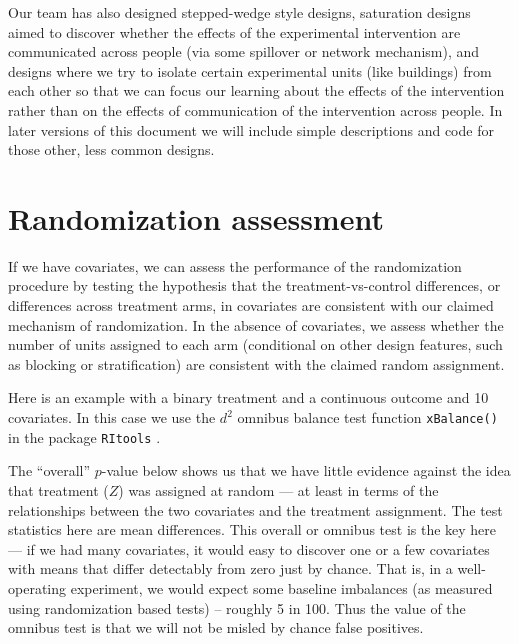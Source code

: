 \documentclass[
  12pt,
]{book}
\newenvironment{Shaded}{\begin{snugshade}}{\end{snugshade}}
\newcommand{\DataTypeTok}[1]{\textcolor[rgb]{0.13,0.29,0.53}{#1}}
\newcommand{\KeywordTok}[1]{\textcolor[rgb]{0.13,0.29,0.53}{\textbf{#1}}}
\newcommand{\NormalTok}[1]{#1}
\newcommand{\OperatorTok}[1]{\textcolor[rgb]{0.81,0.36,0.00}{\textbf{#1}}}
\newcommand{\StringTok}[1]{\textcolor[rgb]{0.31,0.60,0.02}{#1}}
\theoremstyle{definition}
\theoremstyle{definition}
\theoremstyle{definition}
\theoremstyle{remark}
\begin{document}
Our team has also designed stepped-wedge style designs, saturation
designs aimed to discover whether the effects of the experimental
intervention are communicated across people (via some spillover or
network mechanism), and designs where we try to isolate certain
experimental units (like buildings) from each other so that we can focus
our learning about the effects of the intervention rather than on the
effects of communication of the intervention across people. In later
versions of this document we will include simple descriptions and code
for those other, less common designs.

\hypertarget{randomization-assessment}{%
\section{Randomization assessment}\label{randomization-assessment}}

If we have covariates, we can assess the performance of the
randomization procedure by testing the hypothesis that the
treatment-vs-control differences, or differences across treatment arms,
in covariates are consistent with our claimed mechanism of
randomization. In the absence of covariates, we assess whether the
number of units assigned to each arm (conditional on other design
features, such as blocking or stratification) are consistent with the
claimed random assignment.

Here is an example with a binary treatment and a continuous outcome and
10 covariates. In this case we use the \(d^2\) omnibus balance test
function \texttt{xBalance()} in the package \texttt{RItools}
\citetext{\citealp[see][
]{hansen_covariate_2008}; \citealp{bowers_ritools_2016}}.

The ``overall'' \(p\)-value below shows us that we have little evidence
against the idea that treatment (\(Z\)) was assigned at random --- at
least in terms of the relationships between the two covariates and the
treatment assignment. The test statistics here are mean differences.
This overall or omnibus test is the key here --- if we had many
covariates, it would easy to discover one or a few covariates with means
that differ detectably from zero just by chance. That is, in a
well-operating experiment, we would expect some baseline imbalances (as
measured using randomization based tests) -- roughly 5 in 100. Thus the
value of the omnibus test is that we will not be misled by chance false
positives.

\begin{Shaded}
\end{Shaded}
\end{document}
